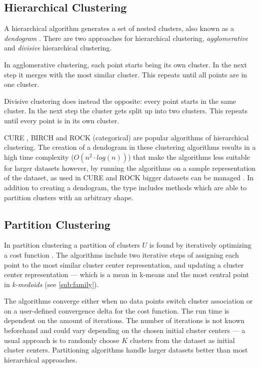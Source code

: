 \documentclass[../report.tex]{subfiles}
\begin{document}
\subsection{Hierarchical Clustering}
A hierarchical algorithm generates a set of nested clusters, also known as a \textit{dendogram} \cite{Xu2015, Jain1999}. There are two approaches for hierarchical clustering, \textit{agglomerative} and \textit{divisive} hierarchical clustering.

In agglomerative clustering, each point starts being its own cluster. In the next step it merges with the most similar cluster. This repeats until all points are in one cluster.

Divisive clustering does instead the opposite: every point starts in the same cluster. In the next step the cluster gets split up into two clusters. This repeats until every point is in its own cluster.

CURE \cite{Jain1999}, BIRCH \cite{zhou2012ensemble} and ROCK (categorical) \cite{Guha2000} are popular algorithms of hierarchical clustering. The creation of a dendogram in these clustering algorithms results in a high time complexity ($O(n^2 \cdot log(n))$) that make the algorithms less suitable for larger datasets however, by running the algorithms on a sample representation of the dataset, as used in CURE and ROCK bigger datasets can be managed \cite{Xu2015,Jain1999}. In addition to creating a dendogram, the type includes methods which are able to partition clusters with an arbitrary shape. %


\subsection{Partition Clustering}
\label{sub:part}
In partition clustering a partition of clusters $U$ is found by iteratively optimizing a cost function \cite{huang2005automated, Xu2015,Jain1999}. The algorithms include two iterative steps of assigning each point to the most similar cluster center representation, and updating a cluster center representation --- which is a mean in k-means and the most central point in \textit{k-medoids} (see \cref{sub:family}).

The algorithms converge either when no data points switch cluster association or on a user-defined convergence delta for the cost function. The run time is dependent on the amount of iterations. The number of iterations is not known beforehand and could vary depending on the chosen initial cluster centers --- a usual approach is to randomly choose $K$ clusters from the dataset as initial cluster centers. Partitioning algorithms handle larger datasets better than most hierarchical approaches.
\end{document}
